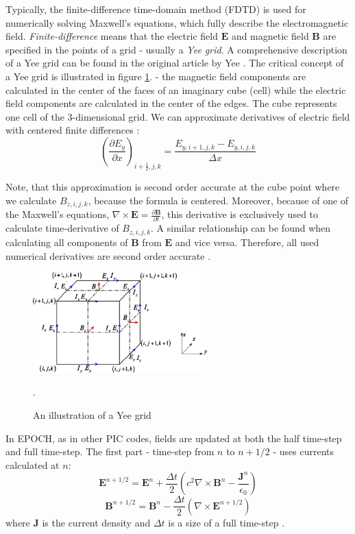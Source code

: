 Typically, the finite-difference time-domain method (FDTD) is used for numerically solving Maxwell's equations, which fully describe the electromagnetic field. \textit{Finite-difference} means that the electric field $\bm{E}$ and magnetic field $\bm{B}$ are specified in the points of a grid - usually a \textit{Yee grid}. A comprehensive description of a Yee grid can be found in the original article by Yee \cite{yee1966}. The critical concept of a Yee grid is illustrated in figure \ref{fig:yee-grid}. - the magnetic field components are calculated in the center of the faces of an imaginary cube (cell) while the electric field components are calculated in the center of the edges. The cube represents one cell of the 3-dimensional grid. We can approximate derivatives of electric field with centered finite differences \cite{arber2015}:
\begin{equation}
	\label{eq:num-der}
	\left(\frac{\partial E_y}{\partial x}\right)_{i+\frac{1}{2},j,k} = \frac{E_{y,i+1,j,k}-E_{y,i,j,k}}{\Delta x} 
\end{equation}

Note, that this approximation is second order accurate at the cube point where we calculate $B_{z,i,j,k}$, because the formula is centered. Moreover, because of one of the Maxwell's equations, $\nabla \times \bm{E} = \frac{\partial \bm{B}}{\partial t}$, this derivative is exclusively used to calculate time-derivative of $B_{z,i,j,k}$. A similar relationship can be found when calculating all components of $\bm{B}$ from $\bm{E}$ and vice versa. Therefore, all used numerical derivatives are second order accurate \cite{arber2015}.

\begin{figure}[t]
	\centering
	\includegraphics[width=0.6\textwidth]{figures/yee-grid}
	\caption{An illustration of a Yee grid \cite{wang2010}}.
	\label{fig:yee-grid}
\end{figure}

In EPOCH, as in other PIC codes, fields are updated at both the half time-step and full time-step. The first part - time-step from $n$ to $n+1/2$ - uses currents calculated at $n$:
\begin{equation}
	\bm{E}^{n+1/2} = \bm{E}^n + \frac{\Delta t}{2}\left(c^2 \nabla\times\bm{B}^n - \frac{\bm{J}^n}{\epsilon_0}\right)
\end{equation}
\begin{equation} 
	\bm{B}^{n+1/2} = \bm{B}^n - \frac{\Delta t}{2}\left(\nabla\times\bm{E}^{n+1/2} \right)
\end{equation}
where $\bm{J}$ is the current density and $\Delta t$ is a size of a full time-step \cite{arber2015}.

